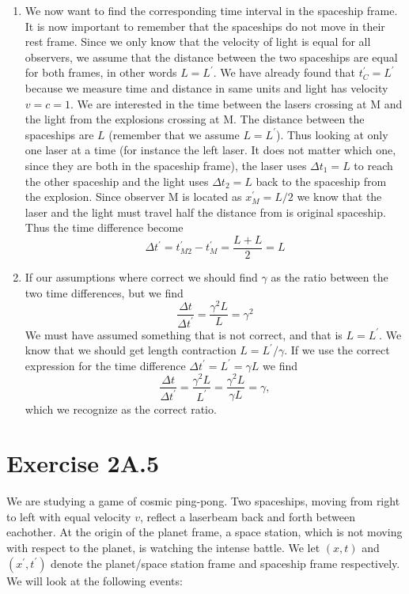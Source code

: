\documentclass[a4paper,10pt,english]{article}
\begin{document}
\begin{enumerate}
\item We now want to find the corresponding time interval in the spaceship frame. It is now important to remember that the spaceships do not move in their rest frame. Since we only know that the velocity of light is equal for all observers, we assume that the distance between the two spaceships are equal for both frames, in other words $L=L^{\prime}$. We have already found that $t_{C}^{\prime}=L^{\prime}$ because we measure time and distance in same units and light has velocity $v=c=1$. We are interested in the time between the lasers crossing at M and the light from the explosions crossing at M. The distance between the spaceships are $L$ (remember that we assume $L=L^{\prime}$). Thus looking at only one laser at a time (for instance the left laser. It does not matter which one, since they are both  in the spaceship frame), the laser uses $\Delta t_{1}=L$ to reach the other spaceship and the light uses $\Delta t_{2}=L$ back to the spaceship from the explosion. Since observer M is located as $x_{M}^{\prime}=L/2$ we know that the laser and the light must travel half the distance from is original spaceship. Thus the time difference become
\[
\Delta t^{\prime}=t_{M2}^{\prime}-t_{M}^{\prime}=\frac{L+L}{2}=L
\]
\item If our assumptions where correct we should find $\gamma$ as the ratio between the two time differences, but we find
\[
\frac{\Delta t}{\Delta t^{\prime}}=\frac{\gamma^{2}L}{L}=\gamma^{2}
\]
We must have assumed something that is not correct, and that is $L=L^{\prime}$. We know that we should get length contraction $L=L^{\prime}/\gamma$. If we use the correct expression for the time difference $\Delta t^{\prime}=L^{\prime}=\gamma L$ we find
\[
\frac{\Delta t}{\Delta t^{\prime}}=\frac{\gamma^{2}L}{L^{\prime}}=\frac{\gamma^{2}L}{\gamma L}=\gamma,
\]
which we recognize as the correct ratio.
\end{enumerate}
%
%
%
%
%
%
%
%
\section*{Exercise 2A.5}

We are studying a game of cosmic ping-pong. Two spaceships, moving from right to left with equal velocity $v$, reflect a laserbeam back and forth between eachother. At the origin of the planet frame, a space station, which is not moving with respect to the planet, is watching the intense battle. We let $(x,t)$ and $(x^{\prime},t^{\prime})$ denote the planet/space station frame and spaceship frame respectively. We will look at the following events:
\end{document}
